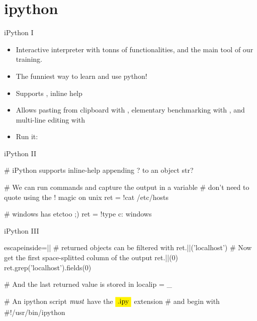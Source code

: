 \section{ipython}



\begin{pyframe}{iPython I}
\begin{itemize}
\item Interactive interpreter with tonns of                                                                                                        functionalities, and the main tool of our training.                                                                                                      

\item   The funniest way to learn and use python!

\item   Supports , inline help 

\item   Allows pasting from clipboard with  , elementary
    benchmarking with , and multi-line editing with 

\item   Run it: \\
\end{itemize}

\end{pyframe}


\begin{pyframe}{iPython II}
\begin{pythoncode}
# iPython supports inline-help appending ? to an object
str?

# We can run commands and capture the output in a variable
# don't need to quote using the ! magic on unix
ret = !cat /etc/hosts

# windows has etc\hosts too ;)
ret = !type c: windows\drivers\etc\hosts
\end{pythoncode}
\end{pyframe}


\begin{pyframe}{iPython III}
\begin{pythoncode*}{escapeinside=||}
# returned objects can be filtered with  
ret.||('localhost')
# Now get the first space-splitted column of the output
ret.||(0)
ret.grep('localhost').fields(0)

# And the last returned value is stored in 
localip = _

# An ipython script $\emph{must}$ have the $\pyver{.ipy}$ extension
#  and begin with #!/usr/bin/ipython 
\end{pythoncode*}
\end{pyframe}

